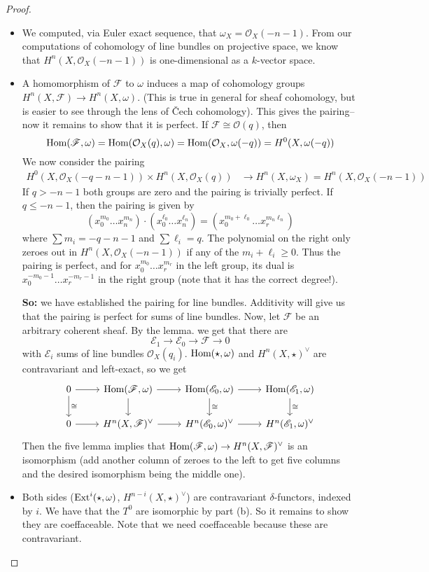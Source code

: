 \documentclass[10pt,reqno]{amsart}
\theoremstyle{definition}
\theoremstyle{remark}
\numberwithin{equation}{section}
\numberwithin{theorem}{section}
\newcommand{\OO}{{\mathcal O}}
\newcommand{\Hom}{\textup{Hom}}
\newcommand{\Ext}{\textup{Ext}}
\newcommand{\FF}{{\mathscr F}}
\newcommand{\EE}{{\mathscr E}}
\begin{document}
\begin{proof}\textup{ }
\begin{itemize}
\item We computed, via Euler exact sequence, that $\omega_X = \OO_X(-n-1)$. From our computations of cohomology of line bundles on projective space, we know that $H^n(X,\OO_X(-n-1))$ is one-dimensional as a $k$-vector space.
\item A homomorphism of $\FF$ to $\omega$ induces a map of cohomology groups $H^n(X,\FF) \to H^n(X,\omega)$. (This is true in general for sheaf cohomology, but is easier to see through the lens of \v Cech cohomology). This gives the pairing-- now it remains to show that it is perfect. If $\FF \cong \OO(q)$, then 
\[\Hom(\FF,\omega) = \Hom(\OO_X(q), \omega) = \Hom(\OO_X, \omega(-q)) = H^0(X,\omega(-q))\]
We now consider the pairing
\begin{align*}
H^0(X,\OO_X(-q-n-1)) \times H^n(X,\OO_X(q)) &\to H^n(X,\omega_X) = H^n(X,\OO_X(-n-1))
\end{align*}
If $q > -n-1$ both groups are zero and the pairing is trivially perfect. If $q \le -n-1$, then the pairing is given by
\[(x_0^{m_0} \dots x_n^{m_n}) \cdot (x_0^{\ell_0} \dots x_n^{\ell_n}) = (x_0^{m_0 + \ell_0} \dots x_r^{m_n \ell_n})\]
where $\sum m_i = -q-n-1$ and $\sum \ell_i = q$. The polynomial on the right only zeroes out in ${H^n(X,\OO_X(-n-1))}$ if any of the $m_i + \ell_i \ge 0$. Thus the pairing is perfect, and for $x_0^{m_0} \dots x_r^{m_r}$ in the left group, its dual is $x_0^{-m_0-1} \dots x_r^{-m_r-1}$ in the right group (note that it has the correct degree!).

\textbf{So:} we have established the pairing for line bundles. Additivity will give us that the pairing is perfect for sums of line bundles. Now, let $\FF$ be an arbitrary coherent sheaf. By the lemma. we get that there are
\[\EE_1 \to \EE_0 \to \FF \to 0\]
with $\EE_i$ sums of line bundles $\OO_X(q_i)$. $\Hom(\star,\omega)$ and $H^n(X,\star)^{\vee}$ are contravariant and left-exact, so we get
\[
\begin{tikzcd}
0 \arrow[d, "\cong"] \arrow[r] & \Hom(\FF,\omega) \arrow[d] \arrow[r]& \Hom(\EE_0,\omega) \arrow[d, "\cong"]\arrow[r] & \Hom(\EE_1,\omega) \arrow[d,"\cong"]\\
0 \arrow[r] & H^n(X,\FF)^{\vee} \arrow[r]  & H^n(\EE_0,\omega)^{\vee} \arrow[r] & H^n(\EE_1,\omega)^{\vee}
\end{tikzcd}
\]
Then the five lemma implies that $\Hom(\FF,\omega) \to H^n(X,\FF)^{\vee}$ is an isomorphism (add another column of zeroes to the left to get five columns and the desired isomorphism being the middle one).
\item
Both sides ($\Ext^i(\star,\omega)$, $H^{n-i}(X,\star)^{\vee}$) are contravariant $\delta$-functors, indexed by $i$. We have that the $T^0$ are isomorphic by part (b). So it remains to show they are coeffaceable. Note that we need coeffaceable because these are contravariant.


\end{itemize}
\end{proof}
\end{document}
